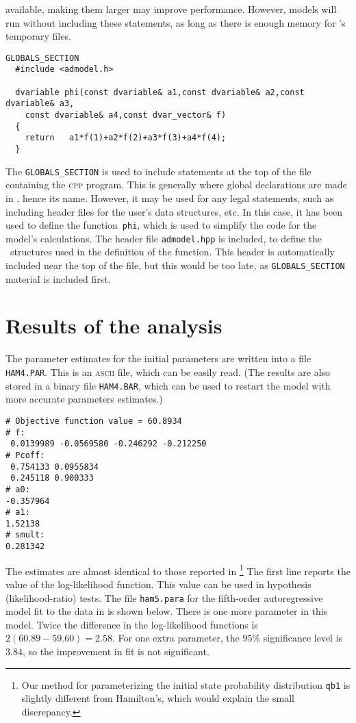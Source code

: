 \documentclass{admbmanual}
\begin{document}
available, making them larger may improve performance. However, models will run
without including these statements, as long as there is enough memory for \ADM's
temporary files.
\begin{lstlisting}
GLOBALS_SECTION
  #include <admodel.h>

  dvariable phi(const dvariable& a1,const dvariable& a2,const dvariable& a3,
    const dvariable& a4,const dvar_vector& f)
  {
    return   a1*f(1)+a2*f(2)+a3*f(3)+a4*f(4);
  }
\end{lstlisting}
The \texttt{GLOBALS\_SECTION} is used to include statements at the top of the
file containing the \textsc{cpp} program. This is generally where global
declarations are made in \cplus, hence its name. However, it may be used for any
legal statements, such as including header files for the user's data structures,
etc. In this case, it has been used to define the function~\texttt{phi}, which
is used to simplify the code for the model's calculations. The header file
\texttt{admodel.hpp} is included, to define the \scAD\ structures used in the
definition of the function. This header is automatically included near the top
of the file, but this would be too late, as \texttt{GLOBALS\_SECTION} material
is included first.

\section{Results of the analysis}

The parameter estimates for the initial parameters are written into a file
\texttt{HAM4.PAR}. This is an \textsc{ascii} file, which can be easily read.
(The results are also stored in a binary file \texttt{HAM4.BAR}, which can be
used to restart the model with more accurate parameters estimates.)
\begin{lstlisting}
# Objective function value = 60.8934
# f:
 0.0139989 -0.0569580 -0.246292 -0.212250
# Pcoff:
 0.754133 0.0955834
 0.245118 0.900333
# a0:
-0.357964
# a1:
1.52138
# smult:
0.281342
\end{lstlisting}
The estimates are almost identical to those reported in
\cite{hamilton1989}\footnote{Our method for parameterizing the initial state
  probability distribution \texttt{qb1} is slightly different from Hamilton's,
  which would explain the small discrepancy.} The first line reports the value
of the log-likelihood function. This value can be used in hypothesis
(likelihood-ratio) tests. The file \texttt{ham5.para} for the fifth-order
autoregressive model fit to the data in \cite{hamilton1989} is shown below.
There is one more parameter in this model. Twice the difference in the
log-likelihood functions is $2(60.89-59.60)=2.58$. For one extra parameter, the
$95\%$ significance level is $3.84$, so the improvement in fit is not
significant.
\end{document}
